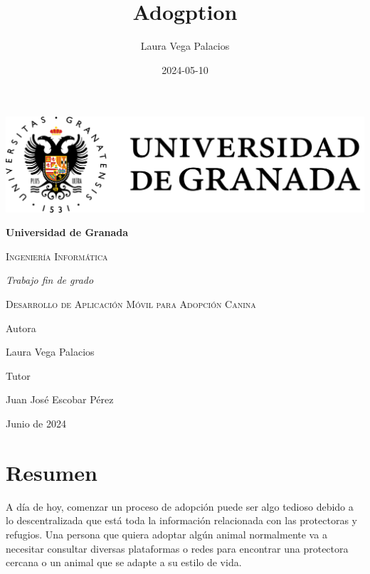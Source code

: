 \documentclass[a4paper, 12pt]{article}
\title{Adogption}
\date{2024-05-10}
\author{Laura Vega Palacios}
\begin{document}
\begin{titlepage}
	\pagestyle{plain}
	\centering
	{\includegraphics[width=1\textwidth]{logoUGR.png}\par}
	{\bfseries\LARGE Universidad de Granada \par}
	{\scshape\Large Ingeniería Informática \par}
	\vspace{0.5cm}
	{\itshape\Large Trabajo fin de grado \par}
	{\scshape\Huge Desarrollo de Aplicación Móvil para Adopción Canina \par}
	\vfill
	{\Large Autora \par}
	{\Large Laura Vega Palacios\par}

	{\Large Tutor \par}
	{\Large Juan José Escobar Pérez\par}
	\vfill
	{\Large Junio de 2024 \par}
\end{titlepage} 

\newpage
\thispagestyle{empty}
\mbox{}

\newpage
\pagestyle{plain}
\section*{Resumen}
A día de hoy, comenzar un proceso de adopción puede ser algo tedioso debido a lo descentralizada que está toda la información relacionada con las protectoras y refugios. Una persona que quiera adoptar algún animal normalmente va a necesitar consultar diversas plataformas o redes para encontrar una protectora cercana o un animal que se adapte a su estilo de vida.
\end{document}
